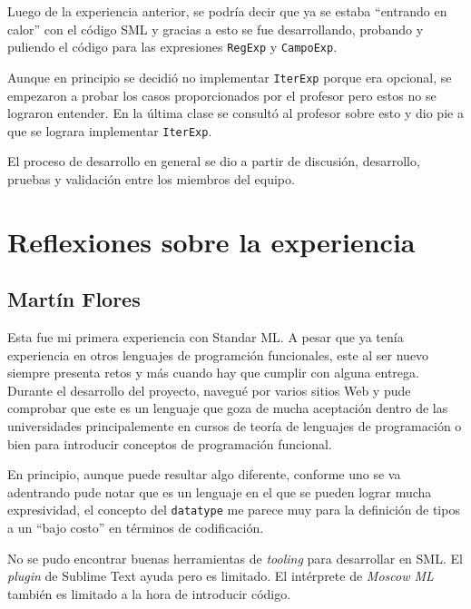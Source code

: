 \documentclass[12pt, times]{simauth}
\begin{document}
Luego de la experiencia anterior, se podría decir que ya se estaba ``entrando en calor'' con el código SML y gracias a esto se fue desarrollando, probando y puliendo el código para las expresiones \texttt{RegExp} y \texttt{CampoExp}. 

Aunque en principio se decidió no implementar \texttt{IterExp} porque era opcional, se empezaron a probar los casos proporcionados por el profesor pero estos no se lograron entender. En la última clase se consultó al profesor sobre esto y dio pie a que se lograra implementar \texttt{IterExp}.

El proceso de desarrollo en general se dio a partir de discusión, desarrollo, pruebas y validación entre los miembros del equipo.

\section{Reflexiones sobre la experiencia}

\subsection{Martín Flores}
Esta fue mi primera experiencia con Standar ML. A pesar que ya tenía experiencia en otros lenguajes de programción funcionales, este al ser nuevo siempre presenta retos y más cuando hay que cumplir con alguna entrega. Durante el desarrollo del proyecto, navegué por varios sitios Web y pude comprobar que este es un lenguaje que goza de mucha aceptación dentro de las universidades principalemente en cursos de teoría de lenguajes de programación o bien para introducir conceptos de programación funcional.

En principio, aunque puede resultar algo diferente, conforme uno se va adentrando pude notar que es un lenguaje en el que se pueden lograr mucha expresividad, el concepto del \texttt{datatype} me parece muy para la definición de tipos a un ``bajo costo'' en términos de codificación. 

No se pudo encontrar buenas herramientas de \emph{tooling} para desarrollar en SML. El \emph{plugin} de Sublime Text ayuda pero es limitado. El intérprete de \emph{Moscow ML} también es limitado a la hora de introducir código.
\end{document}
